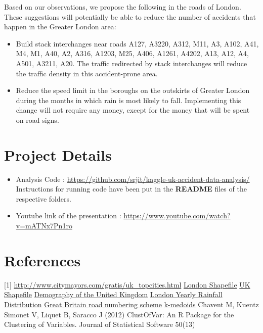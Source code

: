 \documentclass{neu_handout}
\begin{document}
Based on our observations, we propose the following in the roads of London.  These suggestions will potentially be able to reduce the number of accidents that happen in the Greater London area:

\begin{itemize}
\item{Build stack interchanges near roads A127, A3220, A312, M11, A3, A102, A41, M4, M1, A40, A2, A316, A1203, M25, A406, A1261, A4202, A13, A12, A4, A501, A3211, A20. The traffic redirected by stack interchanges will reduce the traffic density in this accident-prone area.}

\item{Reduce the speed limit in the boroughs on the outskirts of Greater London during the months in which rain is most likely to fall. Implementing this change will not require any money, except for the money that will be spent on road signs.}

\end{itemize}

\section{Project Details}
\begin{itemize}
\item Analysis Code : \url{https://github.com/srjit/kaggle-uk-accident-data-analysis/} \\
  Instructions for running code have been put in the \textbf{README} files of the respective folders.
\item Youtube link of the presentation : \url{https://www.youtube.com/watch?v=mATNx7Pn1ro}  
\end{itemize}

\pagebreak

\section{References}
 [1] \url{http://www.citymayors.com/gratis/uk_topcities.html}
\newline
 [2] \href{https://data.london.gov.uk/dataset/statistical-gis-boundary-files-london}{London Shapefile}
 \newline
 [3] \href{http://www.naturalearthdata.com} {UK Shapefile}
 \newline
 [4] \href{https://en.wikipedia.org/wiki/Demography_of_the_United_Kingdom}{Demography of the United Kingdom}
 \newline
 [5] \href{http://projectbritain.com/climate.html}{London Yearly Rainfall Distribution}
 \newline
 [6] \href{https://en.wikipedia.org/wiki/Great_Britain_road_numbering_scheme}{Great Britain road numbering scheme}
 \newline
 [7] \href{https://en.wikipedia.org/wiki/K-medoids}{k-medoids}
 \newline
 [8] Chavent M, Kuentz Simonet V, Liquet B, Saracco J (2012) ClustOfVar: An R Package for the Clustering of Variables. Journal of Statistical Software 50(13)
\end{document}
